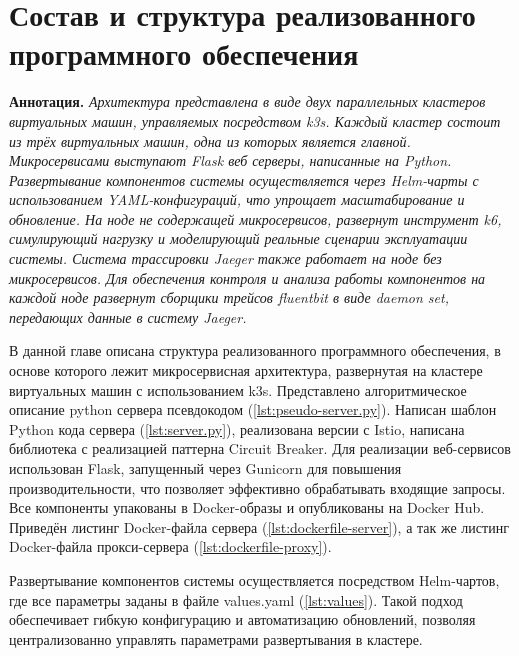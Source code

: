 

\section{Состав и структура реализованного программного обеспечения}

\textbf{Аннотация. } \textit{Архитектура представлена в виде двух параллельных кластеров виртуальных машин, управляемых посредством k3s. Каждый кластер состоит из трёх виртуальных машин, одна из которых является главной. Микросервисами выступают Flask веб серверы, написанные на Python.  Развертывание компонентов системы осуществляется через Helm-чарты с использованием YAML-конфигураций, что упрощает масштабирование и обновление. На ноде не содержащей микросервисов, развернут инструмент k6, симулирующий нагрузку и моделирующий реальные сценарии эксплуатации системы.  Система трассировки Jaeger также работает на ноде без микросервисов. Для обеспечения контроля и анализа работы компонентов на каждой ноде развернут сборщики трейсов fluentbit в виде daemon set, передающих данные в систему Jaeger. }

В данной главе описана структура реализованного программного обеспечения, в основе которого лежит микросервисная архитектура, развернутая на кластере виртуальных машин с использованием k3s. Представлено алгоритмическое описание python сервера псевдокодом (\ref{lst:pseudo-server.py}). Написан шаблон Python кода сервера (\ref{lst:server.py}), реализована версии с Istio, написана библиотека с реализацией паттерна Circuit Breaker. Для реализации веб-сервисов использован Flask, запущенный через Gunicorn для повышения производительности, что позволяет эффективно обрабатывать входящие запросы. Все компоненты упакованы в Docker-образы и опубликованы на Docker Hub. Приведён листинг Docker-файла сервера (\ref{lst:dockerfile-server}), а так же листинг Docker-файла прокси-сервера (\ref{lst:dockerfile-proxy}).

Развертывание компонентов системы осуществляется посредством Helm-чартов, где все параметры заданы в файле values.yaml (\ref{lst:values}). Такой подход обеспечивает гибкую конфигурацию и автоматизацию обновлений, позволяя централизованно управлять параметрами развертывания в кластере. 

